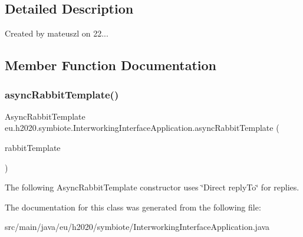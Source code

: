 \subsection{Detailed Description}
Created by mateuszl on 22... 

\subsection{Member Function Documentation}
\mbox{\label{classeu_1_1h2020_1_1symbiote_1_1InterworkingInterfaceApplication_a45f372aa4f5e90820f58913d5c2377c5}} 
\subsubsection{\texorpdfstring{async\+Rabbit\+Template()}{asyncRabbitTemplate()}}
{\footnotesize\ttfamily Async\+Rabbit\+Template eu.\+h2020.\+symbiote.\+Interworking\+Interface\+Application.\+async\+Rabbit\+Template (\begin{DoxyParamCaption}\item[{Rabbit\+Template}]{rabbit\+Template }\end{DoxyParamCaption})}

The following Async\+Rabbit\+Template constructor uses \char`\"{}\+Direct reply\+To\char`\"{} for replies.

The documentation for this class was generated from the following file\+:\begin{DoxyCompactItemize}
\item 
src/main/java/eu/h2020/symbiote/Interworking\+Interface\+Application.\+java\end{DoxyCompactItemize}
